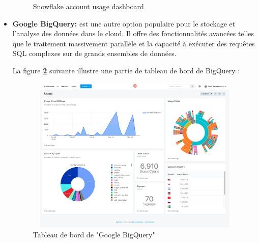 \begin{itemize}
\begin{figure}[H]
            \caption{Snowflake account usage dashboard}
            \label{fig:info}
            \end{figure}
    \item\textbf{Google BigQuery:} est une autre option populaire pour le stockage et l'analyse des données dans le cloud. 
    Il offre des fonctionnalités avancées telles que le traitement massivement parallèle et la capacité à exécuter des requêtes SQL complexes sur de grands ensembles de données. 
    \par La figure \textbf{\ref{fig:BQ}} suivante illustre une partie de tableau de bord de BigQuery :
            \begin{figure}[H]
            \centering
            \includegraphics[width =13cm, height=7.5cm]{img/captures/bigquery}
            \caption{Tableau de bord de "Google BigQuery"}
            \label{fig:BQ}
            \end{figure}


\end{itemize}
